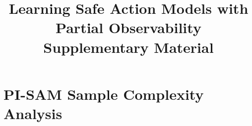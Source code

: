 \documentclass{article}
\title{Learning Safe Action Models with Partial Observability\\ Supplementary Material}
\theoremstyle{plain}
\theoremstyle{definition}
\theoremstyle{remark}
\theoremstyle{observation}
\begin{document}
\maketitle









\appendix
\setcounter{AlgoLine}{0}

\section{PI-SAM Sample Complexity Analysis} 
\end{document}
